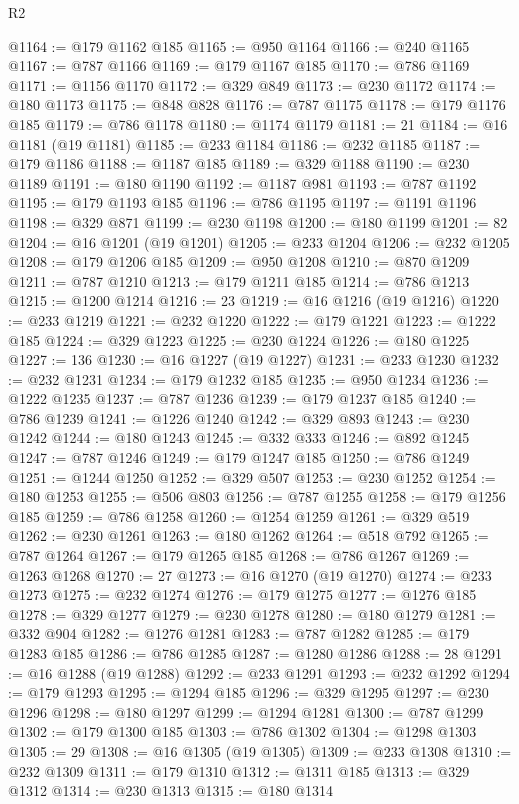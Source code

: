 \begin{lexlean}{R2}
\begin{coremodule}
@1164 := @179 @1162 @185
@1165 := @950 @1164
@1166 := @240 @1165
@1167 := @787 @1166
@1169 := @179 @1167 @185
@1170 := @786 @1169
@1171 := @1156 @1170
@1172 := @329 @849
@1173 := @230 @1172
@1174 := @180 @1173
@1175 := @848 @828
@1176 := @787 @1175
@1178 := @179 @1176 @185
@1179 := @786 @1178
@1180 := @1174 @1179
@1181 := 21
@1184 := @16 @1181 (@19 @1181)
@1185 := @233 @1184
@1186 := @232 @1185
@1187 := @179 @1186
@1188 := @1187 @185
@1189 := @329 @1188
@1190 := @230 @1189
@1191 := @180 @1190
@1192 := @1187 @981
@1193 := @787 @1192
@1195 := @179 @1193 @185
@1196 := @786 @1195
@1197 := @1191 @1196
@1198 := @329 @871
@1199 := @230 @1198
@1200 := @180 @1199
@1201 := 82
@1204 := @16 @1201 (@19 @1201)
@1205 := @233 @1204
@1206 := @232 @1205
@1208 := @179 @1206 @185
@1209 := @950 @1208
@1210 := @870 @1209
@1211 := @787 @1210
@1213 := @179 @1211 @185
@1214 := @786 @1213
@1215 := @1200 @1214
@1216 := 23
@1219 := @16 @1216 (@19 @1216)
@1220 := @233 @1219
@1221 := @232 @1220
@1222 := @179 @1221
@1223 := @1222 @185
@1224 := @329 @1223
@1225 := @230 @1224
@1226 := @180 @1225
@1227 := 136
@1230 := @16 @1227 (@19 @1227)
@1231 := @233 @1230
@1232 := @232 @1231
@1234 := @179 @1232 @185
@1235 := @950 @1234
@1236 := @1222 @1235
@1237 := @787 @1236
@1239 := @179 @1237 @185
@1240 := @786 @1239
@1241 := @1226 @1240
@1242 := @329 @893
@1243 := @230 @1242
@1244 := @180 @1243
@1245 := @332 @333
@1246 := @892 @1245
@1247 := @787 @1246
@1249 := @179 @1247 @185
@1250 := @786 @1249
@1251 := @1244 @1250
@1252 := @329 @507
@1253 := @230 @1252
@1254 := @180 @1253
@1255 := @506 @803
@1256 := @787 @1255
@1258 := @179 @1256 @185
@1259 := @786 @1258
@1260 := @1254 @1259
@1261 := @329 @519
@1262 := @230 @1261
@1263 := @180 @1262
@1264 := @518 @792
@1265 := @787 @1264
@1267 := @179 @1265 @185
@1268 := @786 @1267
@1269 := @1263 @1268
@1270 := 27
@1273 := @16 @1270 (@19 @1270)
@1274 := @233 @1273
@1275 := @232 @1274
@1276 := @179 @1275
@1277 := @1276 @185
@1278 := @329 @1277
@1279 := @230 @1278
@1280 := @180 @1279
@1281 := @332 @904
@1282 := @1276 @1281
@1283 := @787 @1282
@1285 := @179 @1283 @185
@1286 := @786 @1285
@1287 := @1280 @1286
@1288 := 28
@1291 := @16 @1288 (@19 @1288)
@1292 := @233 @1291
@1293 := @232 @1292
@1294 := @179 @1293
@1295 := @1294 @185
@1296 := @329 @1295
@1297 := @230 @1296
@1298 := @180 @1297
@1299 := @1294 @1281
@1300 := @787 @1299
@1302 := @179 @1300 @185
@1303 := @786 @1302
@1304 := @1298 @1303
@1305 := 29
@1308 := @16 @1305 (@19 @1305)
@1309 := @233 @1308
@1310 := @232 @1309
@1311 := @179 @1310
@1312 := @1311 @185
@1313 := @329 @1312
@1314 := @230 @1313
@1315 := @180 @1314

\end{coremodule}
\end{lexlean}
